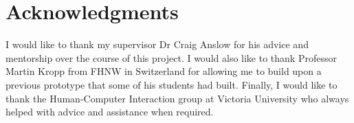 \chapter*{Acknowledgments}\label{C:ack} 
I would like to thank my supervisor Dr Craig Anslow for his advice and mentorship over the course of this project. I would also like to thank Professor Martin Kropp from FHNW in Switzerland for allowing me to build upon a previous prototype that some of his students had built. Finally, I would like to thank the Human-Computer Interaction group at Victoria University who always helped with advice and assistance when required.